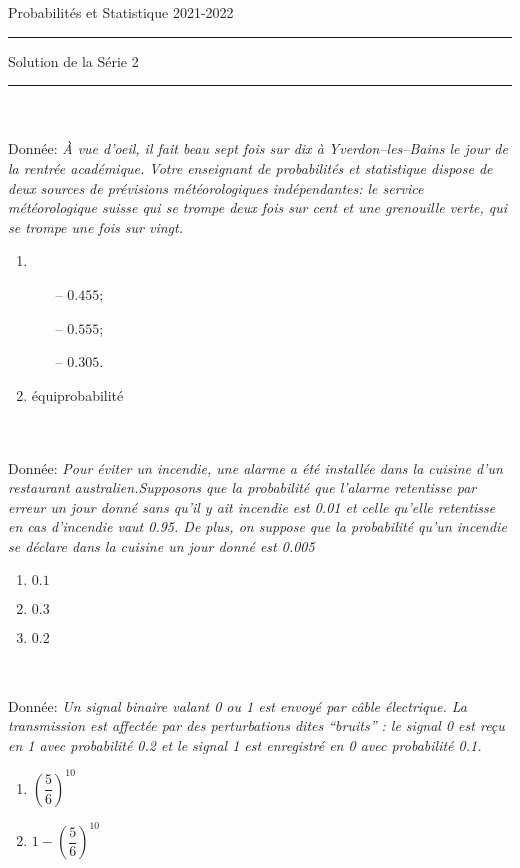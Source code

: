 \documentclass[11pt,a4paper]{report}
\newcounter{num}
\newcommand{\exo}{\addtocounter{num}{1}\noindent{\bf{Exercice \thenum}}\\[-1mm]}
\newcommand{\donnee}[1]{\\{Donnée: } \emph{#1}}
\begin{document}
%
%
 \hfill Probabilités et Statistique\newline 
{} \hfill 2021-2022\newline
\hrule
\vspace{3mm}
 \hfill Solution de la Série 2
\vspace{5mm}
\hrule
\vspace{7mm}

%
%
\exo
\donnee{À vue d’oeil, il fait beau sept fois sur dix à Yverdon–les–Bains le jour de la rentrée académique. Votre enseignant de probabilités et statistique dispose de deux sources de prévisions météorologiques indépendantes: le service météorologique suisse qui se trompe deux fois sur cent et une grenouille verte, qui se trompe une fois sur vingt.}

\begin{enumerate}[label=\alph*)]
	\item 
	\begin{itemize}
		\item[--] $0.455$;
		\item[--] $0.555$;
		\item[--] $0.305$.
	\end{itemize}
	\item équiprobabilité
\end{enumerate}
\vspace{1mm}

%
%
\exo
\donnee{Pour éviter un incendie, une alarme a été installée dans la cuisine d’un restaurant australien.Supposons que la probabilité que l’alarme retentisse par erreur un jour donné sans qu’il y ait incendie est 0.01 et celle qu’elle retentisse en cas d’incendie vaut 0.95. De plus, on suppose que la probabilité qu’un incendie se déclare dans la cuisine un jour donné est 0.005}
\begin{multicols}{3}
\begin{enumerate}[label=\alph*), parsep=0cm, itemsep=3mm, topsep=3mm]
	\item $0.1$
	\item $0.3$
	\item $0.2$
\end{enumerate}
\end{multicols}
\vspace{1mm}

%
%
\exo
\donnee{Un signal binaire valant 0 ou 1 est envoyé par câble électrique. La transmission est affectée par des perturbations dites “bruits” : le signal 0 est reçu en 1 avec probabilité 0.2 et le signal 1 est enregistré en 0 avec probabilité 0.1.}
\begin{multicols}{2}
\begin{enumerate}[label=\alph*), parsep=1mm, itemsep=3mm, topsep=3mm]
	\item\label{q.quatrieme} $\left( \dfrac{5}{6} \right)^{10}$
	\item $1 - \left( \dfrac{5}{6} \right)^{10}$ 
\end{enumerate}
\end{multicols}
\vspace{1mm}
\end{document}
